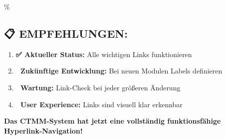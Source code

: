 \hypertarget{empfehlungen}{\%
\subsection{\texorpdfstring{📋 \textbf{EMPFEHLUNGEN:}}{📋 EMPFEHLUNGEN:}}\label{empfehlungen}}

\begin{enumerate}
\def\labelenumi{\arabic{enumi}.}
\tightlist
\item
  \textbf{✅ Aktueller Status:} Alle wichtigen Links funktionieren
\item
  \textbf{🎯 Zukünftige Entwicklung:} Bei neuen Modulen Labels definieren
\item
  \textbf{🔄 Wartung:} Link-Check bei jeder größeren Änderung
\item
  \textbf{📱 User Experience:} Links sind visuell klar erkennbar
\end{enumerate}

\textbf{Das CTMM-System hat jetzt eine vollständig funktionsfähige Hyperlink-Navigation!} 🎉
